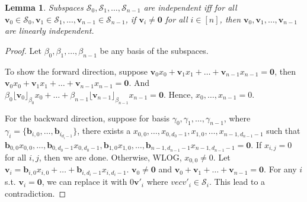 \documentclass{article}
\theoremstyle{plain}
\newtheorem{lemma}[theorem]{Lemma}
\theoremstyle{definition}
\newcommand{\0}{\mathbf{0}}
\renewcommand{\vec}{\mathbf}
\newcommand{\vecspace}[1]{\mathcal{#1}}
\begin{document}
\begin{lemma}
    \label{lemma:independent_from_vectors}
    Subspaces $\vecspace{S}_0, \vecspace{S}_1, \dots, \vecspace{S}_{n-1}$ are independent iff for all $\vec{v}_0\in\vecspace{S}_0, \vec{v}_1\in\vecspace{S}_1, \dots, \vec{v}_{n-1}\in\vecspace{S}_{n-1}$, if $\vec{v}_i\neq\0$ for all $i\in[n]$, then $\vec{v}_0, \vec{v}_1, \dots, \vec{v}_{n-1}$ are linearly independent.
\end{lemma}
\begin{proof}
    Let $\beta_0, \beta_1, \dots, \beta_{n-1}$ be any basis of the subspaces.

    To show the forward direction, suppose $\vec{v}_0x_0+\vec{v}_1x_1+\dots+\vec{v}_{n-1}x_{n-1}=\0$, then $\vec{v}_0x_0+\vec{v}_1x_1+\dots+\vec{v}_{n-1}x_{n-1}=\0$.
    And $\beta_0\lfloor\vec{v}_0\rfloor_{\beta_0}x_0 + \dots + \beta_{n-1}\lfloor\vec{v}_{n-1}\rfloor_{\beta_{n-1}}x_{n-1}=\0$. Hence, $x_0,\dots,x_{n-1}=0$.

    For the backward direction, suppose for basis $\gamma_0, \gamma_1, \dots, \gamma_{n-1}$, where $\gamma_i=\{\vec{b}_{i,0}, \dots, \vec{b}_{i_{d_i-1}}\}$, there exists a $x_{0,0},\dots,x_{0,d_0-1},x_{1,0},\dots,x_{n-1,d_{n-1}-1}$ such that $\vec{b}_{0,0}x_{0,0},\dots,\vec{b}_{0,d_0-1}x_{0,d_0-1},\vec{b}_{1,0}x_{1,0},\dots,\vec{b}_{n-1,d_{n-1}-1}x_{n-1,d_{n-1}-1}=\0$.
    If $x_{i,j}=0$ for all $i,j$, then we are done.
    Otherwise, WLOG, $x_{0,0}\neq0$.
    Let $\vec{v}_i=\vec{b}_{i,0}x_{i,0}+\dots+\vec{b}_{i,d_i-1}x_{i,d_i-1}$.
    $\vec{v}_0\neq\0$ and $\vec{v}_0+\vec{v}_1+\dots+\vec{v}_{n-1}=\0$. For any $i$ s.t. $\vec{v}_i=\0$, we can replace it with $0\vec{v}'_i$ where $vec{v}'_i\in\vecspace{S}_i$. This lead to a contradiction.
\end{proof}

\end{document}
